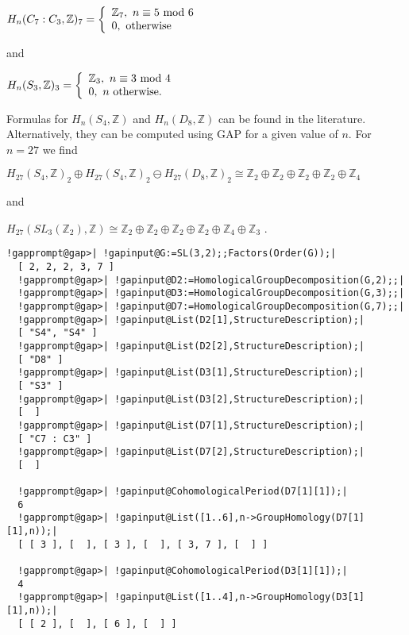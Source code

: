 \documentclass[a4paper,11pt]{report}
\begin{document}
{{$ H_n(C_7 : C_3,\mathbb Z)_7 =\left\{\begin{array}{ll}\mathbb Z_7,\ n \equiv 5
{\rm \ mod\ } 6\\ 0,\ {\rm otherwise} \end{array}\right.$ 

and 

$ H_n(S_3,\mathbb Z)_3 =\left\{\begin{array}{ll}\mathbb Z_3,\ n \equiv 3 {\rm \
mod\ } 4\\ 0,\ n{\rm ~otherwise .} \end{array}\right.$ 

 Formulas for $H_n(S_4,\mathbb Z)$ and $ H_n(D_8,\mathbb Z)$ can be found in the literature. Alternatively, they can be computed using \textsc{GAP} for a given value of $n$. For $n=27$ we find 

$ H_{27}(S_4,\mathbb Z)_2 \oplus H_{27}(S_4,\mathbb Z)_2 \ominus
H_{27}(D_8,\mathbb Z)_2 \cong \mathbb Z_2 \oplus \mathbb Z_2 \oplus \mathbb
Z_2 \oplus \mathbb Z_2 \oplus \mathbb Z_4$ 

 and 

$H_{27}(SL_3(\mathbb Z_2),\mathbb Z) \cong \mathbb Z_2 \oplus \mathbb Z_2
\oplus \mathbb Z_2 \oplus \mathbb Z_2 \oplus \mathbb Z_4 \oplus \mathbb Z_3 $ . 
\begin{Verbatim}[commandchars=!@|,fontsize=\small,frame=single,label=Example]
  !gapprompt@gap>| !gapinput@G:=SL(3,2);;Factors(Order(G));|
  [ 2, 2, 2, 3, 7 ]
  !gapprompt@gap>| !gapinput@D2:=HomologicalGroupDecomposition(G,2);;|
  !gapprompt@gap>| !gapinput@D3:=HomologicalGroupDecomposition(G,3);;|
  !gapprompt@gap>| !gapinput@D7:=HomologicalGroupDecomposition(G,7);;|
  !gapprompt@gap>| !gapinput@List(D2[1],StructureDescription);|
  [ "S4", "S4" ]
  !gapprompt@gap>| !gapinput@List(D2[2],StructureDescription);|
  [ "D8" ]
  !gapprompt@gap>| !gapinput@List(D3[1],StructureDescription);|
  [ "S3" ]
  !gapprompt@gap>| !gapinput@List(D3[2],StructureDescription);|
  [  ]
  !gapprompt@gap>| !gapinput@List(D7[1],StructureDescription);|
  [ "C7 : C3" ]
  !gapprompt@gap>| !gapinput@List(D7[2],StructureDescription);|
  [  ]
  
  !gapprompt@gap>| !gapinput@CohomologicalPeriod(D7[1][1]);|
  6
  !gapprompt@gap>| !gapinput@List([1..6],n->GroupHomology(D7[1][1],n));|
  [ [ 3 ], [  ], [ 3 ], [  ], [ 3, 7 ], [  ] ]
  
  !gapprompt@gap>| !gapinput@CohomologicalPeriod(D3[1][1]);|
  4
  !gapprompt@gap>| !gapinput@List([1..4],n->GroupHomology(D3[1][1],n));|
  [ [ 2 ], [  ], [ 6 ], [  ] ]
  

\end{Verbatim}}}
\end{document}
